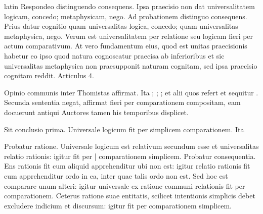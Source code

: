 \begin{otherlanguage*}{latin}
\pstart
  Respondeo distinguendo consequens. Ipsa praecisio non dat universalitatem logicam, concedo; metaphysicam, nego. Ad probationem distinguo consequens. Prius datur cognitio quam universalitas logica, concedo; quam universalitas metaphysica, nego. Verum est universalitatem per relatione seu logicam fieri per actum comparativum. At vero fundamentum eius, quod est unitas praecisionis habetur eo ipso quod natura cognoscatur praecisa ab inferioribus et sic universalitas metaphysica non praesupponit naturam cognitam, sed ipsa praecisio cognitam reddit. Articulus 4. 
\pend

        \pstart
        \pend
      
\pstart
  Opinio communis inter Thomistas affirmat. Ita  ; ; ;  et alii quos refert et sequitur . Secunda sententia negat, affirmat fieri per comparationem compositam, eam docuerunt antiqui Auctores tamen his temporibus displicet. 
\pend

\pstart
  Sit conclusio prima. Universale logicum fit per simplicem comparationem. Ita  
\pend

\pstart
  Probatur ratione. Universale logicum est relativum secundum esse et universalitas relatio rationis: igitur fit per \textnormal{|} comparationem simplicem. Probatur consequentia. Ens rationis fit cum aliquid apprehenditur ubi non est: igitur relatio rationis fit cum apprehenditur ordo in ea, inter quae talis ordo non est. Sed hoc est comparare unum alteri: igitur universale ex ratione communi relationis fit per comparationem. Ceterus ratione suae entitatis, scilicet intentionis simplicis debet excludere indicium et discursum: igitur fit per comparationem simplicem. 
\pend


\end{otherlanguage*}
